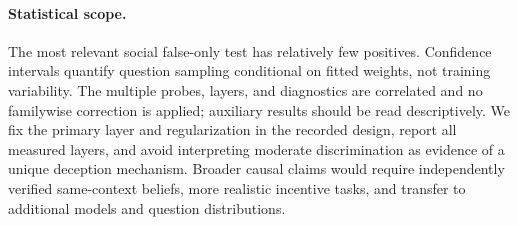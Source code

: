 \paragraph{Statistical scope.}
The most relevant social false-only test has relatively few positives. Confidence intervals quantify question sampling conditional on fitted weights, not training variability. The multiple probes, layers, and diagnostics are correlated and no familywise correction is applied; auxiliary results should be read descriptively. We fix the primary layer and regularization in the recorded design, report all measured layers, and avoid interpreting moderate discrimination as evidence of a unique deception mechanism. Broader causal claims would require independently verified same-context beliefs, more realistic incentive tasks, and transfer to additional models and question distributions.
